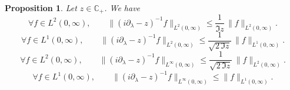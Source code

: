 \documentclass[10pt,a4paper]{amsart}
\newtheorem{proposition}{Proposition}
\begin{document}
\begin{proposition}
\label{prop 2}
Let $z\in\mathbb C_{+}$. We have
\begin{equation}\label{eq:L1-L2-bound 4}
\forall f \in L^2(0,\infty), \qquad \|(i\partial_\lambda-z)^{-1}f\|_{L^2(0,\infty)}
\leq \frac{1}{\Im z}\,\|f\|_{L^2(0,\infty)}.
\end{equation}
\begin{equation}\label{eq:L1-L2-bound 1}
\forall f \in L^1(0,\infty), \qquad \|(i\partial_\lambda-z)^{-1}f\|_{L^2(0,\infty)}
\leq \frac{1}{\sqrt{2\,\Im z}}\,\|f\|_{L^1(0,\infty)}.
\end{equation}
\begin{equation}\label{eq:L1-L2-bound 2}
\forall f \in L^2(0,\infty), \qquad \|(i\partial_\lambda-z)^{-1}f\|_{L^\infty(0,\infty)}
\leq \frac{1}{\sqrt{2\,\Im z}}\,\|f\|_{L^2(0,\infty)}.
\end{equation}
\begin{equation}\label{eq:L1-L2-bound 3}
\forall f \in L^1(0,\infty), \qquad\|(i\partial_\lambda-z)^{-1}f\|_{L^\infty(0,\infty)}
\leq \|f\|_{L^1(0,\infty)}.
\end{equation}
\end{proposition}
\end{document}
